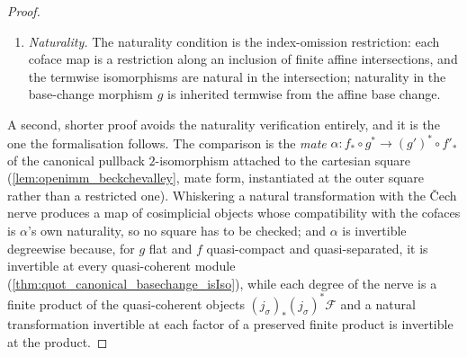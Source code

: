 \begin{proof}
\begin{enumerate}
      \cref{lem:affine_pushforward_pullback_baseChange} (via
      \cref{lem:cech_degree_affine_baseChange}), assembled from the concrete tilde
      dictionaries \cref{lem:pushforward_spec_tilde_iso} and
      \cref{lem:pullback_spec_tilde_iso} with the commutative-algebra cancellation
      \(\operatorname{cancelBaseChange}\) (\cref{lem:cancelBaseChange_mathlib}) --- not the
      canonical adjoint mate.
    \item \emph{Naturality.} The naturality condition is the index-omission
      restriction: each coface map is a restriction along an inclusion of finite affine
      intersections, and the termwise isomorphisms are natural in the intersection;
      naturality in the base-change morphism \(g\) is inherited termwise from the affine
      base change.
  \end{enumerate}

  A second, shorter proof avoids the naturality verification entirely, and it is the one the
  formalisation follows. The comparison is the \emph{mate} \(\alpha : f_* \circ g^* \to (g')^*
  \circ f'_*\) of the canonical pullback \(2\)-isomorphism attached to the cartesian square
  (\cref{lem:openimm_beckchevalley}, mate form, instantiated at the outer square rather than a
  restricted one). Whiskering a natural transformation with the {\v C}ech nerve produces a map of
  cosimplicial objects whose compatibility with the cofaces is \(\alpha\)'s own naturality, so no
  square has to be checked; and \(\alpha\) is invertible degreewise because, for \(g\) flat and
  \(f\) quasi-compact and quasi-separated, it is invertible at every quasi-coherent module
  (\cref{thm:quot_canonical_basechange_isIso}), while each degree of the nerve is a finite product of
  the quasi-coherent objects \((j_\sigma)_*(j_\sigma)^*\mathcal{F}\) and a natural transformation
  invertible at each factor of a preserved finite product is invertible at the product.
\end{proof}

